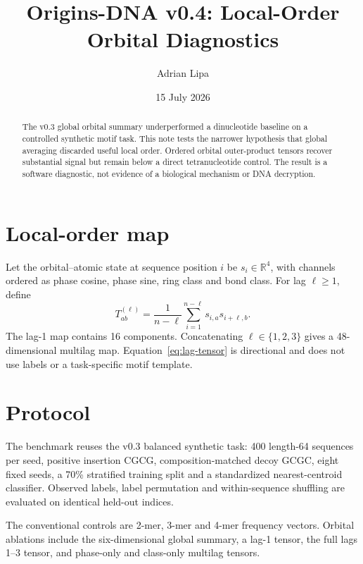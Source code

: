 \documentclass[11pt]{article}
\title{Origins-DNA v0.4: Local-Order Orbital Diagnostics}
\author{Adrian Lipa}
\date{15 July 2026}
\newcommand{\R}{\mathbb{R}}
\begin{document}
\maketitle

\begin{abstract}
The v0.3 global orbital summary underperformed a dinucleotide baseline on a controlled synthetic motif task. This note tests the narrower hypothesis that global averaging discarded useful local order. Ordered orbital outer-product tensors recover substantial signal but remain below a direct tetranucleotide control. The result is a software diagnostic, not evidence of a biological mechanism or DNA decryption.
\end{abstract}

\section{Local-order map}
Let the orbital--atomic state at sequence position \(i\) be \(s_i\in\R^4\), with channels ordered as phase cosine, phase sine, ring class and bond class. For lag \(\ell\geq 1\), define
\begin{equation}
T^{(\ell)}_{ab}
=\frac{1}{n-\ell}\sum_{i=1}^{n-\ell}s_{i,a}s_{i+\ell,b}.
\label{eq:lag-tensor}
\end{equation}
The lag-1 map contains 16 components. Concatenating \(\ell\in\{1,2,3\}\) gives a 48-dimensional multilag map. Equation~\eqref{eq:lag-tensor} is directional and does not use labels or a task-specific motif template.

\section{Protocol}
The benchmark reuses the v0.3 balanced synthetic task: 400 length-64 sequences per seed, positive insertion CGCG, composition-matched decoy GCGC, eight fixed seeds, a 70\% stratified training split and a standardized nearest-centroid classifier. Observed labels, label permutation and within-sequence shuffling are evaluated on identical held-out indices.

The conventional controls are 2-mer, 3-mer and 4-mer frequency vectors. Orbital ablations include the six-dimensional global summary, a lag-1 tensor, the full lags 1--3 tensor, and phase-only and class-only multilag tensors.
\end{document}

